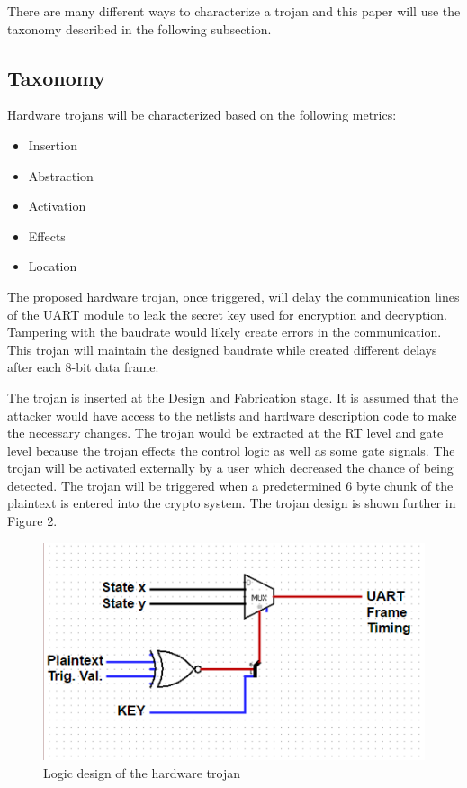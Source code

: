 \documentclass[letterpaper, 10 pt, conference]{ieeeconf}  %
\begin{document}
There are many different ways to characterize a trojan and this paper will use the taxonomy described in the following subsection.

\subsection{Taxonomy}

Hardware trojans will be characterized based on the following metrics:

\begin{itemize}
\item Insertion
\item Abstraction
\item Activation
\item Effects
\item Location
\end{itemize}

The proposed hardware trojan, once triggered, will delay the communication lines of the UART module to leak the secret key used for encryption and decryption.  Tampering with the baudrate would likely create errors in the communication.  This trojan will maintain the designed baudrate while created different delays after each 8-bit data frame.

The trojan is inserted at the Design and Fabrication stage.  It is assumed that the attacker would have access to the netlists and hardware description code to make the necessary changes.  The trojan would be extracted at the RT level and gate level because the trojan effects the control logic as well as some gate signals.  The trojan will be activated externally by a user which decreased the chance of being detected.  The trojan will be triggered when a predetermined 6 byte chunk of the plaintext is entered into the crypto system.  The trojan design is shown further in Figure 2.

\begin{figure}[thpb]
	\centering
	\includegraphics[scale=.50]{trojan}
   \caption{Logic design of the hardware trojan}
\end{figure}
\end{document}
